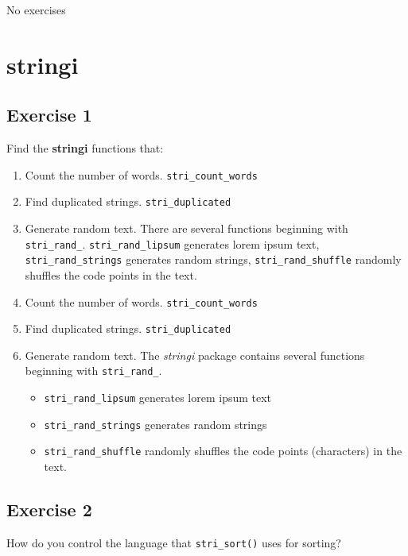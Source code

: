 \documentclass[]{book}
\providecommand{\tightlist}{%
  \setlength{\itemsep}{0pt}\setlength{\parskip}{0pt}}
\theoremstyle{plain}
\theoremstyle{remark}
\theoremstyle{definition}
\theoremstyle{definition}
\theoremstyle{definition}
\theoremstyle{remark}
\begin{document}
No exercises

\hypertarget{stringi}{%
\section{stringi}\label{stringi}}

\hypertarget{exercise-1-42}{%
\subsection{Exercise 1}\label{exercise-1-42}}

Find the \textbf{stringi} functions that:

\begin{enumerate}
\def\labelenumi{\arabic{enumi}.}
\item
  Count the number of words. \texttt{stri\_count\_words}
\item
  Find duplicated strings. \texttt{stri\_duplicated}
\item
  Generate random text. There are several functions beginning with
  \texttt{stri\_rand\_}. \texttt{stri\_rand\_lipsum} generates lorem
  ipsum text, \texttt{stri\_rand\_strings} generates random strings,
  \texttt{stri\_rand\_shuffle} randomly shuffles the code points in the
  text.
\item
  Count the number of words. \texttt{stri\_count\_words}
\item
  Find duplicated strings. \texttt{stri\_duplicated}
\item
  Generate random text. The \emph{stringi} package contains several
  functions beginning with \texttt{stri\_rand\_}.

  \begin{itemize}
  \tightlist
  \item
    \texttt{stri\_rand\_lipsum} generates lorem ipsum text
  \item
    \texttt{stri\_rand\_strings} generates random strings
  \item
    \texttt{stri\_rand\_shuffle} randomly shuffles the code points
    (characters) in the text.
  \end{itemize}
\end{enumerate}

\hypertarget{exercise-2-40}{%
\subsection{Exercise 2}\label{exercise-2-40}}

How do you control the language that \texttt{stri\_sort()} uses for
sorting?
\end{document}
